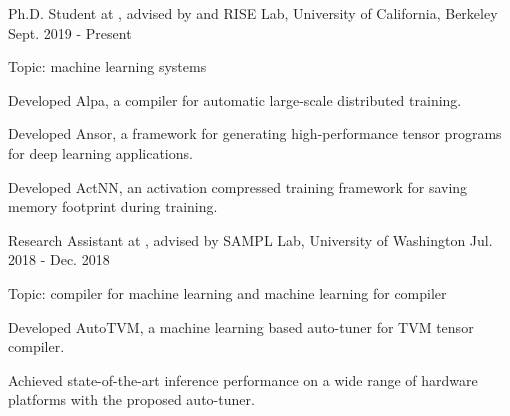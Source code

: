 

\begin{cventries}


\cventry
	{Ph.D. Student at , advised by    and
    } %
	{RISE Lab, University of California, Berkeley} %
	{Sept. 2019 - Present} %
	{} %
	{
		\begin{cvitems} %
			\item{Topic: machine learning systems}
			\item{Developed Alpa, a compiler for automatic large-scale distributed training.}
			\item{Developed Ansor, a framework for generating high-performance tensor programs for deep learning applications.}
			\item{Developed ActNN, an activation compressed training framework for saving memory footprint during training.}
		\end{cvitems}
	}

\cventry
	{Research Assistant at , advised by } %
	{SAMPL Lab, University of Washington} %
	{Jul. 2018 - Dec. 2018} %
	{} %
	{
		\begin{cvitems} %
			\item{Topic: compiler for machine learning and machine learning for compiler}
			\item {Developed AutoTVM, a machine learning based auto-tuner for TVM tensor compiler.}
			\item {Achieved state-of-the-art inference performance on a wide range of hardware platforms with the proposed auto-tuner.}
		\end{cvitems}
    }


\end{cventries}

